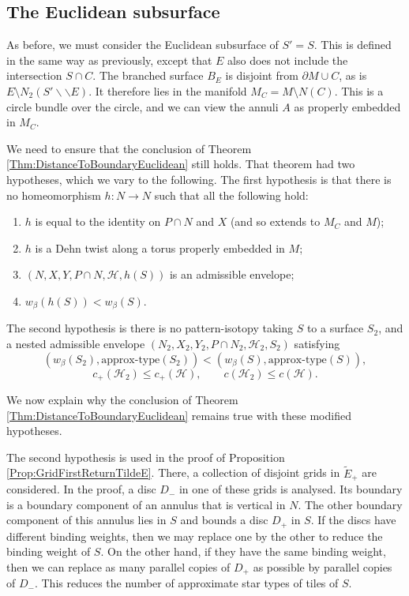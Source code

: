 \documentclass[oneside]{amsart}
\numberwithin{equation}{section}
\theoremstyle{plain}
\theoremstyle{definition}
\newcommand{\cut}{\backslash\backslash}
\begin{document}
\subsection{The Euclidean subsurface}

As before, we must consider the Euclidean subsurface of $S' = S$. This is defined in
the same way as previously, except that $E$ also does not include the intersection $S \cap C$.
The branched surface $B_E$ is disjoint from $\partial M \cup C$, as is $E \setminus N_2(S' \cut E)$.
It therefore lies in the manifold $M_C = M \setminus N(C)$. This is a circle bundle over
the circle, and we can view the annuli $A$ as properly embedded in $M_C$.

We need to ensure that the conclusion of Theorem \ref{Thm:DistanceToBoundaryEuclidean} still holds. That theorem had two hypotheses,
which we vary to the following. The first hypothesis is that there is no homeomorphism $h \colon N \rightarrow N$
such that all the following hold:
\begin{enumerate}
\item $h$ is equal to the identity on $P \cap N$ and $X$ (and so extends to $M_C$ and $M$);
\item $h$ is a Dehn twist along a torus properly embedded in $M$;
\item $(N, X, Y, P \cap N, \mathcal{H}, h(S))$ is an admissible envelope;
\item $w_\beta(h(S)) < w_\beta(S)$.
\end{enumerate}
The second hypothesis is there is no pattern-isotopy taking $S$ to a surface $S_2$, and a
nested admissible envelope
$(N_2, X_2, Y_2, P \cap N_2, \mathcal{H}_2, S_2)$ satisfying
$$(w_\beta(S_2), \text{approx-type}(S_2)) < (w_\beta(S), \text{approx-type}(S)),$$
$$c_+(\mathcal{H}_2) \leq c_+(\mathcal{H}), \qquad c(\mathcal{H}_2) \leq c(\mathcal{H}).$$

We now explain why the conclusion of Theorem \ref{Thm:DistanceToBoundaryEuclidean} remains
true with these modified hypotheses.

The second hypothesis is used in the proof of Proposition \ref{Prop:GridFirstReturnTildeE}.
There, a collection of disjoint grids in $\tilde E_+$ are considered. In the proof, a
disc $D_-$ in one of these grids is analysed. Its boundary is a boundary component
of an annulus that is vertical in $N$. The other boundary component of this annulus
lies in $S$ and bounds a disc $D_+$ in $S$. If the discs have different binding
weights, then we may replace one by the other to reduce the binding weight of $S$.
On the other hand, if they have the same binding weight, then we can
replace as many parallel copies of $D_+$ as possible by parallel copies of $D_-$.
This reduces the number of approximate star types of tiles of $S$.
\end{document}
